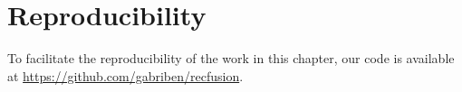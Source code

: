 %

%

%
%
%
%
%
%
%
%
%



\section*{Reproducibility}
To facilitate the reproducibility of the work in this chapter, our code is available at \url{https://github.com/gabriben/recfusion}.









